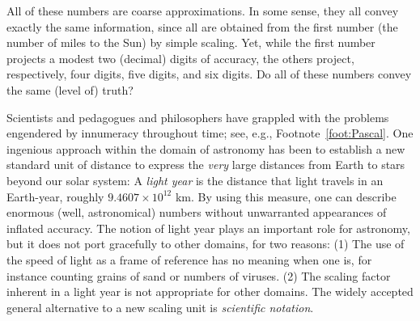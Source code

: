 \medskip

\noindent {}

\medskip


All of these numbers are coarse approximations.  In some sense, they
all convey exactly the same information, since all are obtained from
the first number (the number of miles to the Sun) by simple scaling.
Yet, while the first number projects a modest two (decimal) digits of
accuracy, the others project, respectively, four digits, five digits,
and six digits.  Do all of these numbers convey the same (level of)
truth?

\medskip

Scientists and pedagogues and philosophers have grappled with the
problems engendered by innumeracy throughout time; see, e.g.,
Footnote~\ref{foot:Pascal}.  One ingenious approach within the domain
of astronomy has been to establish a new standard unit of distance to
express the {\em very} large distances from Earth to stars beyond our
solar system: A {\em light year} is the distance that light travels in
an Earth-year, roughly $9.4607 \times 10^{12}$ km.  By using this
measure, one can describe enormous (well, astronomical) numbers
without unwarranted appearances of inflated accuracy.  The notion of
light year plays an important role for astronomy, but it does not port
gracefully to other domains, for two reasons: (1) The use of the speed
of light as a frame of reference has no meaning when one is, for
instance counting grains of sand or numbers of viruses.  (2) The
scaling factor inherent in a light year is not appropriate for other
domains.  The widely accepted general alternative to a new scaling
unit is {\em scientific notation}.  

